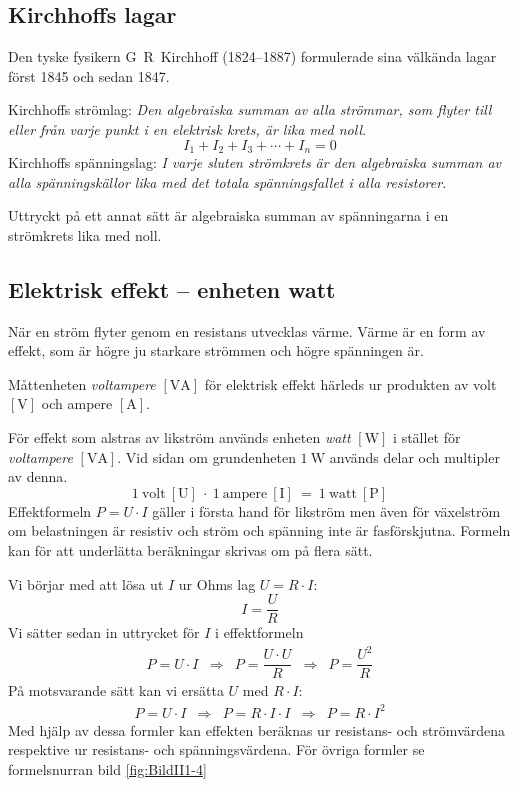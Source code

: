 \subsection{Kirchhoffs lagar}

Den tyske fysikern G~R~Kirchhoff (1824--1887) formulerade sina välkända lagar
först 1845 och sedan 1847.

Kirchhoffs strömlag: \emph{Den algebraiska summan av alla strömmar, som flyter till eller från varje punkt i en elektrisk krets, är lika med noll.}
\[I_1 + I_2 + I_3 + \cdots + I_n = 0\]
Kirchhoffs spänningslag: \emph{I varje sluten strömkrets är den algebraiska summan av alla spänningskällor lika med det totala spänningsfallet i alla resistorer.}

Uttryckt på ett annat sätt är algebraiska summan av spänningarna i en
strömkrets lika med noll.

\subsection{Elektrisk effekt -- enheten watt}

När en ström flyter genom en resistans utvecklas värme.
Värme är en form av effekt, som är högre ju starkare strömmen och högre
spänningen är.

Måttenheten \emph{voltampere} \(\mathrm{[VA]}\) för elektrisk effekt härleds ur
produkten av volt \(\mathrm{[V]}\) och ampere \(\mathrm{[A]}\).

För effekt som alstras av likström används enheten \emph{watt} \(\mathrm{[W]}\)
\cite{SIbrochure8} i stället för \emph{voltampere} \(\mathrm{[VA]}\).
Vid sidan om grundenheten \(1\ \mathrm{W}\) används delar och multipler av
denna.
\[1\ \mathrm{volt\ [U]}\ \cdot\ 1\ \mathrm{ampere\ [I]}\ =\ 1\ \mathrm{watt\ [P]}\]
Effektformeln \(P = U \cdot I\) gäller i första hand för likström men även för
växelström om belastningen är resistiv och ström och spänning inte är
fasförskjutna.
Formeln kan för att underlätta beräkningar skrivas om på flera sätt.

Vi börjar med att lösa ut $I$ ur Ohms lag $U = R \cdot I$:
\[
I = \dfrac{U}{R}
\]
Vi sätter sedan in uttrycket för $I$ i effektformeln
\[
\begin{array}{lllll}
P=U \cdot I & \Rightarrow & P= \dfrac{U \cdot U}{R} & \Rightarrow & P= \dfrac{U^2}{R}
\end{array}
\]
På motsvarande sätt kan vi ersätta $U$ med $R \cdot I$:
\[
\begin{array}{lllll}
P=U \cdot I & \Rightarrow & P = R \cdot I \cdot I  & \Rightarrow & P = R \cdot I^2
\end{array}
\]
Med hjälp av dessa formler kan effekten beräknas ur resistans- och strömvärdena
respektive ur resistans- och spänningsvärdena.
För övriga formler se for\-mel\-snu\-r\-r\-an bild \ref{fig:BildII1-4}


